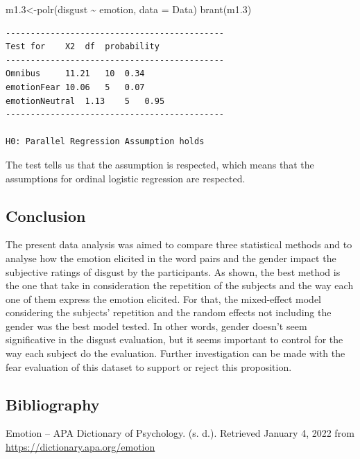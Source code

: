 \documentclass[
]{article}
\newenvironment{Shaded}{\begin{snugshade}}{\end{snugshade}}
\newcommand{\AttributeTok}[1]{\textcolor[rgb]{0.77,0.63,0.00}{#1}}
\newcommand{\FloatTok}[1]{\textcolor[rgb]{0.00,0.00,0.81}{#1}}
\newcommand{\FunctionTok}[1]{\textcolor[rgb]{0.00,0.00,0.00}{#1}}
\newcommand{\NormalTok}[1]{#1}
\newcommand{\OtherTok}[1]{\textcolor[rgb]{0.56,0.35,0.01}{#1}}
\newcommand{\SpecialCharTok}[1]{\textcolor[rgb]{0.00,0.00,0.00}{#1}}
\begin{document}
\begin{Shaded}
\begin{Highlighting}[]
\NormalTok{m1}\FloatTok{.3}\OtherTok{\textless{}{-}}\FunctionTok{polr}\NormalTok{(disgust }\SpecialCharTok{\textasciitilde{}}\NormalTok{ emotion, }\AttributeTok{data =}\NormalTok{ Data)}
\FunctionTok{brant}\NormalTok{(m1}\FloatTok{.3}\NormalTok{)}
\end{Highlighting}
\end{Shaded}

\begin{verbatim}
-------------------------------------------- 
Test for    X2  df  probability 
-------------------------------------------- 
Omnibus     11.21   10  0.34
emotionFear 10.06   5   0.07
emotionNeutral  1.13    5   0.95
-------------------------------------------- 

H0: Parallel Regression Assumption holds
\end{verbatim}

The test tells us that the assumption is respected, which means that the
assumptions for ordinal logistic regression are respected.

\hypertarget{conclusion}{%
\subsection{Conclusion}\label{conclusion}}

The present data analysis was aimed to compare three statistical methods
and to analyse how the emotion elicited in the word pairs and the gender
impact the subjective ratings of disgust by the participants. As shown,
the best method is the one that take in consideration the repetition of
the subjects and the way each one of them express the emotion elicited.
For that, the mixed-effect model considering the subjects' repetition
and the random effects not including the gender was the best model
tested. In other words, gender doesn't seem significative in the disgust
evaluation, but it seems important to control for the way each subject
do the evaluation. Further investigation can be made with the fear
evaluation of this dataset to support or reject this proposition.

\hypertarget{bibliography}{%
\subsection{Bibliography}\label{bibliography}}

Emotion -- APA Dictionary of Psychology. (s. d.). Retrieved January 4,
2022 from \url{https://dictionary.apa.org/emotion}
\end{document}
